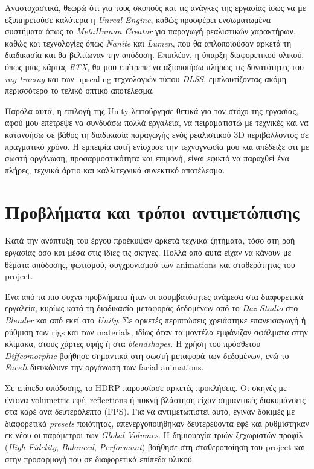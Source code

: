 Αναστοχαστικά, θεωρώ ότι για τους σκοπούς και τις ανάγκες της εργασίας 
ίσως να με εξυπηρετούσε καλύτερα η \textit{Unreal Engine}, 
καθώς προσφέρει ενσωματωμένα συστήματα όπως το \textit{MetaHuman Creator} 
για παραγωγή ρεαλιστικών χαρακτήρων, 
καθώς και τεχνολογίες όπως \textit{Nanite} και \textit{Lumen}, 
που θα απλοποιούσαν αρκετά τη διαδικασία και θα βελτίωναν την απόδοση. 
Επιπλέον, η ύπαρξη διαφορετικού υλικού, όπως μιας κάρτας \textit{RTX}, 
θα μου επέτρεπε να αξιοποιήσω πλήρως τις δυνατότητες του 
\textit{ray tracing} και των upscaling τεχνολογιών τύπου \textit{DLSS}, 
εμπλουτίζοντας ακόμη περισσότερο το τελικό οπτικό αποτέλεσμα.

Παρόλα αυτά, η επιλογή της Unity λειτούργησε θετικά για τον στόχο της εργασίας, 
αφού μου επέτρεψε να συνδυάσω πολλά εργαλεία, να πειραματιστώ 
με τεχνικές και να κατανοήσω σε βάθος τη διαδικασία παραγωγής 
ενός ρεαλιστικού 3D περιβάλλοντος σε πραγματικό χρόνο. 
Η εμπειρία αυτή ενίσχυσε την τεχνογνωσία μου και απέδειξε 
ότι με σωστή οργάνωση, προσαρμοστικότητα και επιμονή, 
είναι εφικτό να παραχθεί ένα πλήρες, τεχνικά άρτιο και καλλιτεχνικά συνεκτικό αποτέλεσμα.

\section{Προβλήματα και τρόποι αντιμετώπισης}
Κατά την ανάπτυξη του έργου προέκυψαν αρκετά τεχνικά ζητήματα, 
τόσο στη ροή εργασίας όσο και μέσα στις ίδιες τις σκηνές. 
Πολλά από αυτά είχαν να κάνουν με θέματα απόδοσης, 
φωτισμού, συγχρονισμού των animations και σταθερότητας του project.

Ένα από τα πιο συχνά προβλήματα ήταν οι ασυμβατότητες ανάμεσα στα διαφορετικά εργαλεία, 
κυρίως κατά τη διαδικασία μεταφοράς δεδομένων από το \textit{Daz Studio} 
στο \textit{Blender} και από εκεί στο \textit{Unity}. 
Σε αρκετές περιπτώσεις χρειάστηκε επανεισαγωγή ή ρύθμιση των rigs και των materials, 
ιδίως όταν τα μοντέλα εμφάνιζαν σφάλματα στην κλίμακα, στους χάρτες υφής 
ή στα \textit{blendshapes}. 
Η χρήση του πρόσθετου \textit{Diffeomorphic} βοήθησε σημαντικά 
στη σωστή μεταφορά των δεδομένων, ενώ το \textit{FaceIt} 
διευκόλυνε την οργάνωση των facial animations.

Σε επίπεδο απόδοσης, το HDRP παρουσίασε αρκετές προκλήσεις. 
Οι σκηνές με έντονα volumetric εφέ, reflections ή πυκνή βλάστηση 
είχαν σημαντικές διακυμάνσεις στα καρέ ανά δευτερόλεπτο (FPS). 
Για να αντιμετωπιστεί αυτό, έγιναν δοκιμές με διαφορετικά \textit{presets} ποιότητας, 
απενεργοποιήθηκαν δευτερεύοντα εφέ και ρυθμίστηκαν εκ νέου 
οι παράμετροι των \textit{Global Volumes}. 
Η δημιουργία τριών ξεχωριστών προφίλ (\textit{High Fidelity}, 
\textit{Balanced}, \textit{Performant}) 
βοήθησε στη σταθεροποίηση του project και στην προσαρμογή του 
σε διαφορετικά επίπεδα υλικού.

